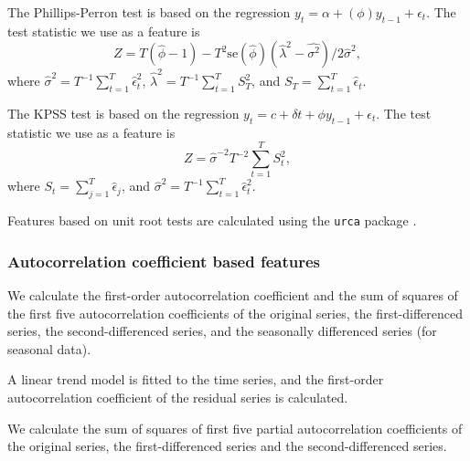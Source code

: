 \documentclass[11pt,a4paper,]{article}
\theoremstyle{definition}
\theoremstyle{definition}
\theoremstyle{definition}
\theoremstyle{remark}
\begin{document}
The Phillips-Perron test is based on the regression
\(y_t=\alpha+(\phi)y_{t-1}+ \epsilon_t\). The test statistic we use as a
feature is \[
  Z = T(\hat{\phi}-1)- T^2\text{se}(\hat{\phi})(\hat{\lambda}^2-\hat{\sigma^2})/2\hat\sigma^2,
\] where \(\hat\sigma^2= T^{-1}\sum_{t=1}^{T} \hat\epsilon_t^2\),
\(\hat\lambda^2=T^{-1} \sum_{t=1}^{T} S_T^2\), and
\(S_T = \sum_{t=1}^{T}\hat\epsilon_t\).

The KPSS test is based on the regression
\(y_t=c+\delta t+\phi y_{t-1}+\epsilon_t\). The test statistic we use as
a feature is \[
  Z= \hat{\sigma}^{-2} T^{-2}\sum_{t=1}^{T}S_t^2,
\] where \(S_t=\sum_{j=1}^T\hat{\epsilon}_j\), and
\(\hat{\sigma}^2 = T^{-1}\sum_{t=1}^{T} \hat\epsilon_t^2\).

Features based on unit root tests are calculated using the \texttt{urca}
package \autocite{pfaff2016package}.

\subsubsection*{Autocorrelation coefficient based
features}\label{autocorrelation-coefficient-based-features}

We calculate the first-order autocorrelation coefficient and the sum of
squares of the first five autocorrelation coefficients of the original
series, the first-differenced series, the second-differenced series, and
the seasonally differenced series (for seasonal data).

A linear trend model is fitted to the time series, and the first-order
autocorrelation coefficient of the residual series is calculated.

We calculate the sum of squares of first five partial autocorrelation
coefficients of the original series, the first-differenced series and
the second-differenced series.

\newpage

\printbibliography[title=References]
\end{document}
